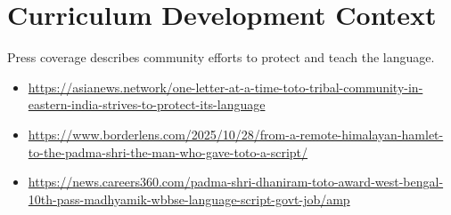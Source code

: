 \documentclass[12pt]{article}
\begin{document}
\section{Curriculum Development Context}
Press coverage describes community efforts to protect and teach the language.
\begin{itemize}
\item \url{https://asianews.network/one-letter-at-a-time-toto-tribal-community-in-eastern-india-strives-to-protect-its-language}
\item \url{https://www.borderlens.com/2025/10/28/from-a-remote-himalayan-hamlet-to-the-padma-shri-the-man-who-gave-toto-a-script/}
\item \url{https://news.careers360.com/padma-shri-dhaniram-toto-award-west-bengal-10th-pass-madhyamik-wbbse-language-script-govt-job/amp}
\end{itemize}
\end{document}
